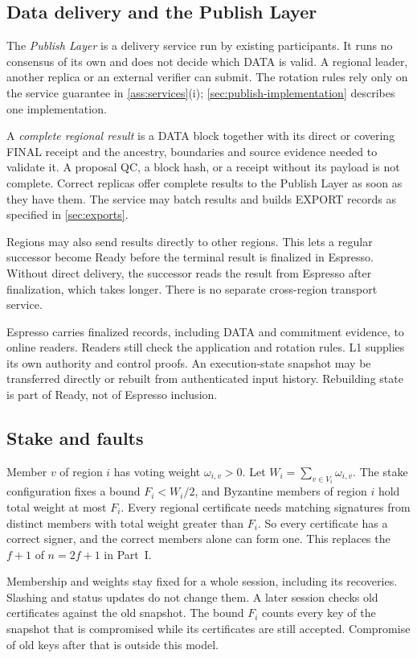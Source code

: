 \documentclass[11pt,a4paper]{article}
\newcommand{\defterm}[1]{\textcolor{rrBlue}{\textit{#1}}}
\begin{document}
\subsection{Data delivery and the Publish Layer}
\label{sec:delivery}
The \defterm{Publish Layer} is a delivery service run by existing
participants. It runs no consensus of its own and does not decide which
DATA is valid. A regional leader, another replica or an external
verifier can submit. The rotation rules rely only on the service
guarantee in \cref{ass:services}(i); \cref{sec:publish-implementation}
describes one implementation.

A \defterm{complete regional result} is a DATA block together with its
direct or covering FINAL receipt and the ancestry, boundaries and source
evidence needed to validate it. A proposal QC, a block hash, or a receipt
without its payload is not complete. Correct replicas offer complete
results to the Publish Layer as soon as they have them. The service may
batch results and builds EXPORT records as specified in
\cref{sec:exports}.

Regions may also send results directly to other regions. This lets a
regular successor become Ready before the terminal result is finalized
in Espresso. Without direct delivery, the successor reads the result
from Espresso after finalization, which takes longer. There is no
separate cross-region transport service.

Espresso carries finalized records, including DATA and commitment
evidence, to online readers. Readers still check the application and
rotation rules. L1 supplies its own authority and control proofs. An
execution-state snapshot may be transferred directly or rebuilt from
authenticated input history. Rebuilding state is part of Ready,
not of Espresso inclusion.

\subsection{Stake and faults}
\label{sec:stake}
Member $v$ of region $i$ has voting weight $\omega_{i,v}>0$. Let
$W_i=\sum_{v\in V_i}\omega_{i,v}$. The stake configuration fixes a bound
$F_i<W_i/2$, and Byzantine members of region $i$ hold total weight at
most $F_i$. Every regional certificate needs matching signatures from
distinct members with total weight greater than $F_i$. So every
certificate has a correct signer, and the correct members alone can form
one. This replaces the $f+1$ of $n=2f+1$ in Part~I.

Membership and weights stay fixed for a whole session, including its
recoveries. Slashing and status updates do not change them. A later
session checks old certificates against the old snapshot. The bound
$F_i$ counts every key of the snapshot that is compromised while its
certificates are still accepted. Compromise of old keys after that is
outside this model.
\end{document}

